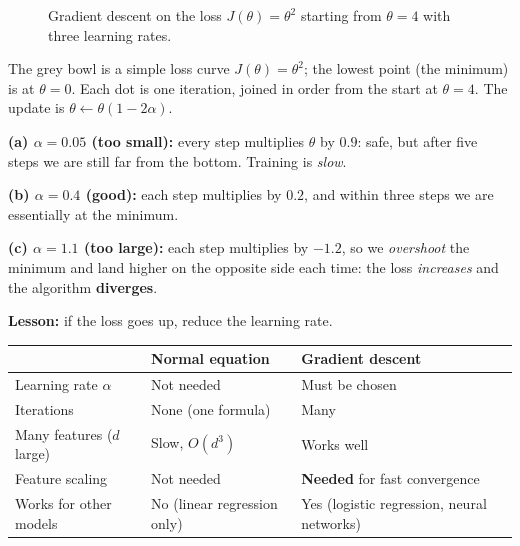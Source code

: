 \begin{figure}[!htbp]
\centering
{}
\caption{Gradient descent on the loss $J(\theta)=\theta^2$ starting from $\theta=4$ with three learning rates.}\label{fig:gd}
\end{figure}

\begin{explain}
The grey bowl is a simple loss curve $J(\theta)=\theta^2$; the lowest point (the minimum) is at $\theta=0$. Each dot is one iteration, joined in order from the start at $\theta=4$. The update is $\theta\leftarrow\theta(1-2\alpha)$.\par
\textbf{(a) $\alpha=0.05$ (too small):} every step multiplies $\theta$ by $0.9$: safe, but after five steps we are still far from the bottom. Training is \emph{slow}.\par
\textbf{(b) $\alpha=0.4$ (good):} each step multiplies by $0.2$, and within three steps we are essentially at the minimum.\par
\textbf{(c) $\alpha=1.1$ (too large):} each step multiplies by $-1.2$, so we \emph{overshoot} the minimum and land higher on the opposite side each time: the loss \emph{increases} and the algorithm \textbf{diverges}.\par
\textbf{Lesson:} if the loss goes up, reduce the learning rate.
\end{explain}

\begin{center}
\begin{tabular}{@{}p{4.1cm}p{4.9cm}p{4.9cm}@{}}
\toprule
 & \textbf{Normal equation} & \textbf{Gradient descent}\\
\midrule
Learning rate $\alpha$ & Not needed & Must be chosen\\
Iterations & None (one formula) & Many\\
Many features ($d$ large) & Slow, $O(d^3)$ & Works well\\
Feature scaling & Not needed & \textbf{Needed} for fast convergence\\
Works for other models & No (linear regression only) & Yes (logistic regression, neural networks)\\
\bottomrule
\end{tabular}
\end{center}

